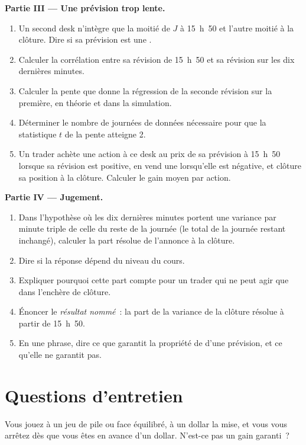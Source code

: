 \begin{problem}
\medskip\noindent\textbf{Partie III --- Une prévision trop lente.}
\begin{enumerate}[resume]
\item Un second desk n'intègre que la moitié de $J$ à 15~h~50 et l'autre moitié à la clôture. Dire si
sa prévision est une .
\item Calculer la corrélation entre sa révision de 15~h~50 et sa révision sur les dix
dernières minutes.
\item Calculer la pente que donne la régression de la seconde révision sur la première, en théorie et
dans la simulation.
\item Déterminer le nombre de journées de données nécessaire pour que la statistique $t$ de la pente atteigne 2.
\item Un trader achète une action à ce desk au prix de sa prévision à 15~h~50 lorsque sa révision est
positive, en vend une lorsqu'elle est négative, et clôture sa position à la clôture. Calculer le
gain moyen par action.
\end{enumerate}

\medskip\noindent\textbf{Partie IV --- Jugement.}
\begin{enumerate}[resume]
\item Dans l'hypothèse où les dix dernières minutes portent une variance par minute triple de celle du reste de la
journée (le total de la journée restant inchangé), calculer la part résolue de l'annonce à la clôture.
\item Dire si la réponse dépend du niveau du cours.
\item Expliquer pourquoi cette part compte pour un trader qui ne peut agir que dans l'enchère de clôture.
\item Énoncer le \emph{résultat nommé}~: la part de la variance de la clôture résolue à partir de 15~h~50.
\item En une phrase, dire ce que garantit la propriété de  d'une prévision, et ce
qu'elle ne garantit pas.
\end{enumerate}
\end{problem}

\section{Questions d'entretien}

\begin{interviewq}\label{iq:qm:probability-at-speed:1}
Vous jouez à un jeu de pile ou face équilibré, à un dollar la mise, et vous vous arrêtez dès que vous êtes en avance d'un dollar.
N'est-ce pas un gain garanti~?
\end{interviewq}

